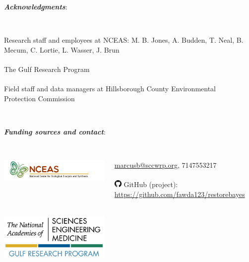 \documentclass[serif]{beamer}\usepackage[]{graphicx}\usepackage[]{color}
\newcommand{\emtxt}[1]{\textbf{\textit{{\color{mypal4} #1}}}}
\begin{document}
\begin{frame}
\emtxt{Acknowledgments}:\\~\\
\begin{columns}
\begin{column}{0.8\textwidth}
{\footnotesize
Research staff and employees at NCEAS: M. B. Jones, A. Budden, T. Neal, B. Mecum, C. Lortie, L. Wasser, J. Brun  \\~\\
The Gulf Research Program \\~\\
Field staff and data managers at Hillsborough County Environmental Protection Commission}\\~\\
\end{column}
\begin{column}{0.2\textwidth}
\end{column}
\end{columns}
\vfill
\emtxt{Funding sources and contact}:\\~\\
\begin{columns}
\begin{column}{0.5\textwidth}
\centerline{\includegraphics[width=\linewidth]{fig/nceas_full.png}}\\~\\
\vspace{0.15in}
\centerline{\includegraphics[width=0.6\linewidth]{fig/grplogo.png}}
\end{column}
\begin{column}{0.5\textwidth}
\scriptsize
\href{mailto:marcusb@sccwrp.org}{marcusb@sccwrp.org}, 7147553217\\~\\
\includegraphics[width = 0.05\textwidth]{fig/git.png} GitHub (project): \href{https://github.com/fawda123/restorebayes}{https://github.com/fawda123/restorebayes}\\~\\

\end{column}
\end{columns}
\end{frame}
\end{document}
